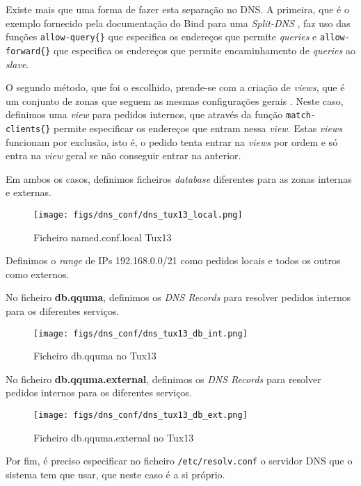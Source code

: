 Existe mais que uma forma de fazer esta separação no DNS.
A primeira, que é o exemplo fornecido pela documentação do Bind para uma \textit{Split-DNS} \cite{bind1}, faz uso das funções
\verb|allow-query{}| que especifica os endereços que permite \textit{queries} e \verb|allow-forward{}| que especifica os endereços que permite encaminhamento de \textit{queries} ao \textit{slave}.

O segundo método, que foi o escolhido, prende-se com a criação de \textit{views}, que é um conjunto de zonas que seguem as mesmas configurações gerais \cite{bind2}.
Neste caso, definimos uma \textit{view} para pedidos internos, que através da função \verb|match-clients{}| permite especificar os endereços que entram nessa \textit{view}.
Estas \textit{views} funcionam por exclusão, isto é, o pedido tenta entrar na \textit{views} por ordem e só entra na \textit{view} geral se não conseguir entrar na anterior.

Em ambos os casos, definimos ficheiros \textit{database} diferentes para as zonas internas e externas.

\begin{figure}[H]
    \centering
    \texttt{[image: figs/dns\_conf/dns\_tux13\_local.png]}
    \caption{Ficheiro named.conf.local Tux13}
    \label{fig:dns_tux13_local}
\end{figure}

Definimos o \textit{range} de IPs 192.168.0.0/21 como pedidos locais e todos os outros como externos.

No ficheiro \textbf{db.qquma}, definimos os \textit{DNS Records} para resolver pedidos internos para os diferentes serviços.

\begin{figure}[H]
    \centering
    \texttt{[image: figs/dns\_conf/dns\_tux13\_db\_int.png]}
    \caption{Ficheiro db.qquma no Tux13}
    \label{fig:dns_tux13_db_int}
\end{figure}

No ficheiro \textbf{db.qquma.external}, definimos os \textit{DNS Records} para resolver pedidos internos para os diferentes serviços.

\begin{figure}[H]
    \centering
    \texttt{[image: figs/dns\_conf/dns\_tux13\_db\_ext.png]}
    \caption{Ficheiro db.qquma.external no Tux13}
    \label{fig:dns_tux13_db_ext}
\end{figure}

Por fim, é preciso especificar no ficheiro \verb|/etc/resolv.conf| o servidor DNS que o sistema tem que usar, que neste caso é a si próprio.

